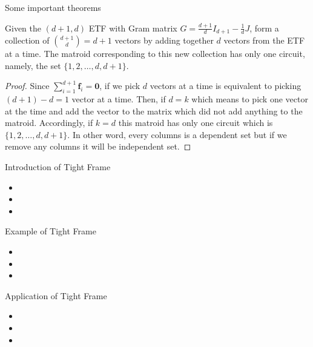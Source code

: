 \documentclass{beamer}
\renewcommand{\vec}[1]{\mathbf{#1}}
\begin{document}
\begin{frame}{Some important theorems}
    \begin{theorem}[K. Lin, 2023]
Given the $(d+1, d)$ ETF with Gram matrix
$G = \frac{d+1}{d}I_{d+1} -\frac{1}{d}J$,
form a collection of $\binom{d+1}{d} = d+1$ vectors by adding together $d$ vectors from the ETF at a time.
The matroid corresponding to this new collection has only one circuit, namely, the set $\{1, 2, \ldots, d, d+1\}$.
\end{theorem}
\begin{proof}
Since $\sum_{i=1}^{d+1}\vec{f}_i = \vec{0}$,
if we pick $d$ vectors at a time is equivalent to picking $(d+1)-d = 1$ vector at a time. 
Then, if $d=k$ which means to pick one vector at the time and add the vector to the matrix which did not add anything to the matroid.
Accordingly, if $k=d$ this matroid has only one circuit which is $\{1, 2, \ldots, d, d+1\}$.
In other word, every columns is a dependent set but if we remove any columns it will be independent set.
\end{proof}
\end{frame}


\begin{frame}{Introduction of Tight Frame}
  \begin{itemize}
    \item 
    \item 
    \item 
  \end{itemize}
\end{frame}

\begin{frame}{Example of Tight Frame}
  \begin{itemize}
    \item 
    \item 
    \item 
  \end{itemize}
\end{frame}

\begin{frame}{Application of Tight Frame}
  \begin{itemize}
    \item 
    \item 
    \item 
  \end{itemize}
\end{frame}
\end{document}
